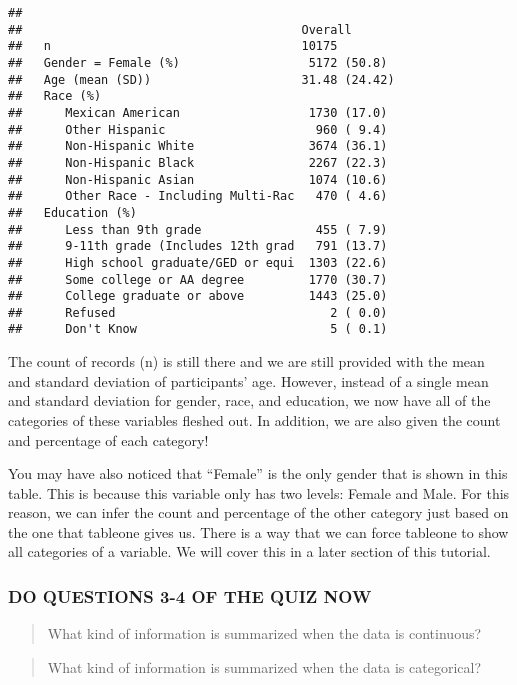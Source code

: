 \documentclass[
]{book}
\begin{document}
\begin{verbatim}
##
##                                       Overall
##   n                                   10175
##   Gender = Female (%)                  5172 (50.8)
##   Age (mean (SD))                     31.48 (24.42)
##   Race (%)
##      Mexican American                  1730 (17.0)
##      Other Hispanic                     960 ( 9.4)
##      Non-Hispanic White                3674 (36.1)
##      Non-Hispanic Black                2267 (22.3)
##      Non-Hispanic Asian                1074 (10.6)
##      Other Race - Including Multi-Rac   470 ( 4.6)
##   Education (%)
##      Less than 9th grade                455 ( 7.9)
##      9-11th grade (Includes 12th grad   791 (13.7)
##      High school graduate/GED or equi  1303 (22.6)
##      Some college or AA degree         1770 (30.7)
##      College graduate or above         1443 (25.0)
##      Refused                              2 ( 0.0)
##      Don't Know                           5 ( 0.1)
\end{verbatim}

The count of records (n) is still there and we are still provided with the mean and standard deviation of participants' age. However, instead of a single mean and standard deviation for gender, race, and education, we now have all of the categories of these variables fleshed out. In addition, we are also given the count and percentage of each category!

You may have also noticed that ``Female'' is the only gender that is shown in this table. This is because this variable only has two levels: Female and Male. For this reason, we can infer the count and percentage of the other category just based on the one that tableone gives us. There is a way that we can force tableone to show all categories of a variable. We will cover this in a later section of this tutorial.

\hypertarget{do-questions-3-4-of-the-quiz-now}{%
\subsubsection{DO QUESTIONS 3-4 OF THE QUIZ NOW}\label{do-questions-3-4-of-the-quiz-now}}

\begin{quote}
What kind of information is summarized when the data is continuous?
\end{quote}

\begin{quote}
What kind of information is summarized when the data is categorical?
\end{quote}
\end{document}
